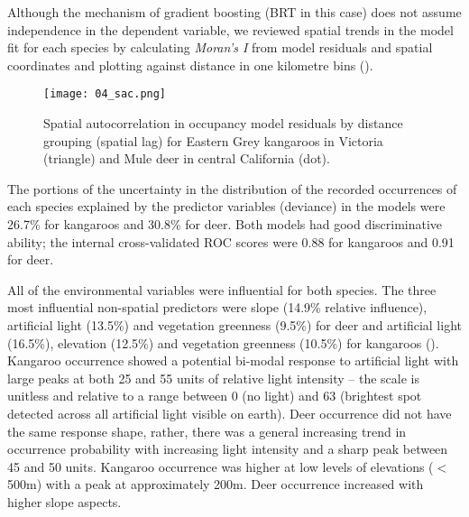 Although the mechanism of gradient boosting (BRT in this case) does not assume independence in the dependent variable, we reviewed spatial trends in the model fit for each species by calculating \textit{Moran's I} from model residuals and spatial coordinates and plotting against distance in one kilometre bins ().

\begin{figure*}[!h]
  \centering
  \texttt{[image: 04\_sac.png]}
  \caption[Spatial autocorrelation in occupancy model residuals for kangaroos and deer]{Spatial autocorrelation in occupancy model residuals by distance grouping (spatial lag) for Eastern Grey kangaroos in Victoria (triangle) and Mule deer in central California (dot).}
  \label{cal_sac_occ}
\end{figure*}

The portions of the uncertainty in the distribution of the recorded occurrences of each species explained by the predictor variables (deviance) in the models were 26.7\% for kangaroos and 30.8\% for deer. Both models had good discriminative ability; the internal cross-validated ROC scores were 0.88 for kangaroos and 0.91 for deer.

All of the environmental variables were influential for both species. The three most influential non-spatial predictors were slope (14.9\% relative influence), artificial light (13.5\%) and vegetation greenness (9.5\%) for deer and artificial light (16.5\%), elevation (12.5\%) and vegetation greenness (10.5\%) for kangaroos ().  Kangaroo occurrence showed a potential bi-modal response to artificial light with large peaks at both 25 and 55 units of relative light intensity -- the scale is unitless and relative to a range between 0 (no light) and 63 (brightest spot detected across all artificial light visible on earth).  Deer occurrence did not have the same response shape, rather, there was a general increasing trend in occurrence probability with increasing light intensity and a sharp peak between 45 and 50 units. Kangaroo occurrence was higher at low levels of elevations ($<$500m) with a peak at approximately 200m.  Deer occurrence increased with higher slope aspects.

